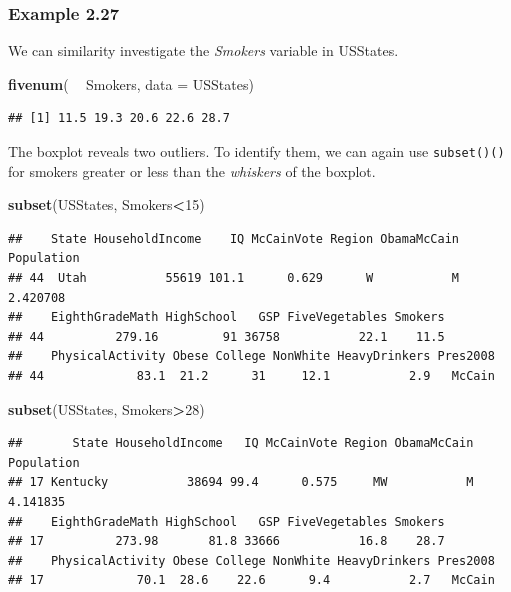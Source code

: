 \documentclass[]{book}
\newenvironment{Shaded}{\begin{snugshade}}{\end{snugshade}}
\newcommand{\DataTypeTok}[1]{\textcolor[rgb]{0.13,0.29,0.53}{#1}}
\newcommand{\DecValTok}[1]{\textcolor[rgb]{0.00,0.00,0.81}{#1}}
\newcommand{\KeywordTok}[1]{\textcolor[rgb]{0.13,0.29,0.53}{\textbf{#1}}}
\newcommand{\NormalTok}[1]{#1}
\newcommand{\OperatorTok}[1]{\textcolor[rgb]{0.81,0.36,0.00}{\textbf{#1}}}
\newcommand{\StringTok}[1]{\textcolor[rgb]{0.31,0.60,0.02}{#1}}
\begin{document}
\hypertarget{example-2.27}{%
\subsubsection{Example 2.27}\label{example-2.27}}

We can similarity investigate the \emph{Smokers} variable in {USStates}.

\begin{Shaded}
\begin{Highlighting}[]
\KeywordTok{fivenum}\NormalTok{( }\OperatorTok{~}\StringTok{ }\NormalTok{Smokers, }\DataTypeTok{data =}\NormalTok{ USStates)}
\end{Highlighting}
\end{Shaded}

\begin{verbatim}
## [1] 11.5 19.3 20.6 22.6 28.7
\end{verbatim}

The boxplot reveals two outliers. To identify them, we can again use \texttt{subset()()} for smokers greater or less than the \emph{whiskers} of the boxplot.

\begin{Shaded}
\begin{Highlighting}[]
\KeywordTok{subset}\NormalTok{(USStates, Smokers}\OperatorTok{<}\DecValTok{15}\NormalTok{)}
\end{Highlighting}
\end{Shaded}

\begin{verbatim}
##    State HouseholdIncome    IQ McCainVote Region ObamaMcCain Population
## 44  Utah           55619 101.1      0.629      W           M   2.420708
##    EighthGradeMath HighSchool   GSP FiveVegetables Smokers
## 44          279.16         91 36758           22.1    11.5
##    PhysicalActivity Obese College NonWhite HeavyDrinkers Pres2008
## 44             83.1  21.2      31     12.1           2.9   McCain
\end{verbatim}

\begin{Shaded}
\begin{Highlighting}[]
\KeywordTok{subset}\NormalTok{(USStates, Smokers}\OperatorTok{>}\DecValTok{28}\NormalTok{)}
\end{Highlighting}
\end{Shaded}

\begin{verbatim}
##       State HouseholdIncome   IQ McCainVote Region ObamaMcCain Population
## 17 Kentucky           38694 99.4      0.575     MW           M   4.141835
##    EighthGradeMath HighSchool   GSP FiveVegetables Smokers
## 17          273.98       81.8 33666           16.8    28.7
##    PhysicalActivity Obese College NonWhite HeavyDrinkers Pres2008
## 17             70.1  28.6    22.6      9.4           2.7   McCain
\end{verbatim}
\end{document}
